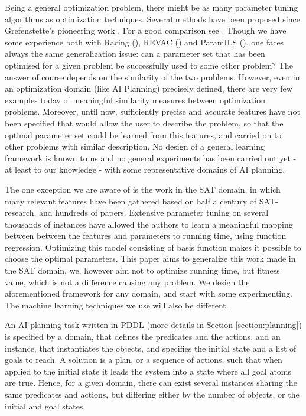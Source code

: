 \documentclass{acm_proc_article-sp}
\begin{document}
Being a general optimization problem, there might be as many parameter tuning algorithms as optimization techniques. Several methods have been proposed  since Grefenstette's pioneering work \cite{Grefenstette86}. For a good comparison see \cite{Montero:2010}. Though we have some experience both with Racing (\cite{bibai:2009}), REVAC (\cite{Nannen07}) and ParamILS (\cite{ParamILS-JAIR}), one faces always the same generalization issue: can a parameter set that has been optimised for a given problem be successfully used to some other problem? The answer of course depends on the similarity of the two problems. However, even in an optimization domain (like AI Planning) precisely defined, there are very few examples today of meaningful similarity measures between optimization problems. Moreover, until now, sufficiently precise and accurate features have not been specified that would allow the user to describe the problem, so that the optimal parameter set could be learned from this features, and carried on to other problems with similar description. No design of a general learning framework is known to us and no general experiments has been carried out yet - at least to our knowledge - with some representative domains of AI planning.

The one exception we are aware of is the work \cite{Hutter06} in the SAT domain, in which many relevant features have been gathered based on half a century of SAT-research, and hundreds of papers. Extensive parameter tuning on several thousands of instances have allowed the authors to learn a meaningful mapping between between the features and parameters to running time, using function regression. Optimizing this model consisting of basis function makes it possible to choose the optimal parameters. This paper aims to generalize this work made in the SAT domain, we, however aim not to optimize running time, but fitness value, which is not a difference causing any problem. We design the aforementioned framework for any domain, and start with some experimenting. The machine learning techniques we use will also be different.

An AI planning task written in PDDL (more details in Section \ref{section:planning}) is specified by a domain, that defines the predicates and the actions, and an instance, that instantiates the objects, and specifies the initial state and a list of goals to reach. A solution is a plan, or a sequence of actions, such that when applied to the initial state it leads the system into a state where all goal atoms are true. Hence, for a given domain, there can exist several instances sharing the same predicates and actions, but differing either by the number of objects, or the initial and goal states. 
\end{document}

